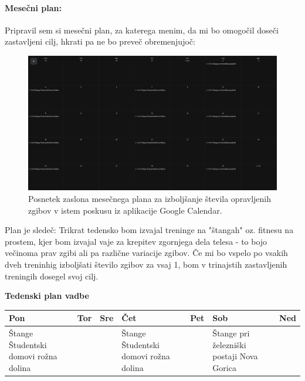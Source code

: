 \documentclass{article}
\begin{document}
\paragraph{Mesečni plan:}
Pripravil sem si mesečni plan, za katerega menim, da mi bo omogočil doseči zastavljeni cilj, hkrati pa ne bo preveč obremenjujoč:

\begin{figure}[H]
    \centering
    \includegraphics[width=1\textwidth]{figures/Stange-mesecni-plan.png}
    \caption{Posnetek zaslona mesečnega plana za izboljšanje števila opravljenih zgibov v istem poskusu iz aplikacije Google Calendar.} 
    \label{fig:mesecni-plan}
\end{figure}

Plan je sledeč: Trikrat tedensko bom izvajal treninge na "štangah" oz. fitnesu na prostem, kjer bom izvajal vaje za krepitev zgornjega dela telesa - to bojo večinoma prav zgibi ali pa različne variacije zgibov. Če mi bo vspelo po vsakih dveh treninhig izboljšati število zgibov za vsaj 1, bom v trinajstih zastavljenih treningih dosegel svoj cilj.

\begin{center}
  \textbf{\Large Tedenski plan vadbe}
\end{center}

\vspace{0.5cm}

\begin{tabularx}{\textwidth}{|p{2.3cm}|p{0.5cm}|p{0.5cm}|p{2.3cm}|p{0.5cm}|p{2.3cm}|X|}
  \hline
  Pon & Tor & Sre & Čet & Pet & Sob & Ned \\
  \hline
  Štange Študentski domovi rožna dolina &  &  & Štange Študentski domovi rožna dolina & & Štange pri železniški postaji Nova Gorica & \\
  \hline
\end{tabularx}
\end{document}
